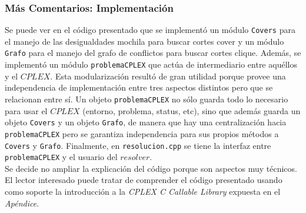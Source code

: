 \subsubsection{Más Comentarios: Implementación}

Se puede ver en el código presentado que se implementó un módulo \verb_Covers_ para el manejo de las desigualdades mochila para buscar cortes cover y un módulo \verb_Grafo_ para el manejo del grafo de conflictos para buscar cortes clique. Además, se implementó un módulo \verb_problemaCPLEX_ que actúa de intermediario entre aquéllos y el $CPLEX$. Esta modularización resultó de gran utilidad porque provee una independencia de implementación entre tres aspectos distintos pero que se relacionan entre sí. Un objeto \verb_problemaCPLEX_ no sólo guarda todo lo necesario para usar el $CPLEX$ (entorno, problema, status, etc), sino que además guarda un objeto \verb_Covers_ y un objeto \verb_Grafo_, de manera que hay una centralización hacia \verb_problemaCPLEX_ pero se garantiza independencia para sus propios métodos a \verb_Covers_ y \verb_Grafo_. Finalmente, en \verb_resolucion.cpp_ se tiene la interfaz entre \verb_problemaCPLEX_ y el usuario del $resolver$.\\

Se decide no ampliar la explicación del código porque son aspectos muy técnicos. El lector interesado puede tratar de comprender el código presentado usando como soporte la introducción a la \emph{CPLEX C Callable Library} expuesta en el  \emph{Apéndice}.
